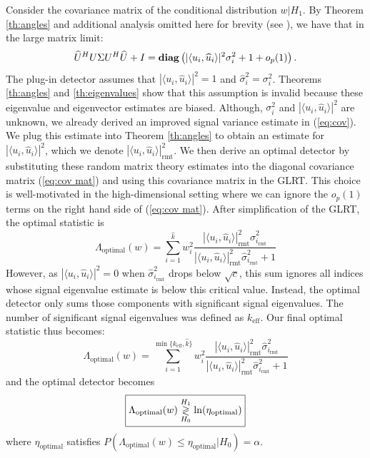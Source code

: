 Consider the covariance matrix of the conditional distribution $w|H_1$. By Theorem \ref{th:angles} and additional analysis omitted here for brevity (see \cite{asendorf}), we have that in the large matrix limit:
\begin{equation}\label{eq:cov mat}
\widehat{U}^HU\Sigma U^H\widehat{U}+I = \diag\left(|\langle u_i,\widehat{u}_i\rangle|^2\sigma_i^2 + 1 + o_{p}(1)\right).
\end{equation}
The plug-in detector assumes that $|\langle u_i,\widehat{u}_i\rangle|^2=1$ and $\widehat{\sigma}_i^2=\sigma_i^2$. Theorems \ref{th:angles} and \ref{th:eigenvalues} show that this assumption is invalid because these eigenvalue and eigenvector estimates are biased. Although, $\sigma_i^2$ and $|\langle u_i,\widehat{u}_i\rangle|^2$ are unknown, we already derived an improved signal variance estimate in (\ref{eq:cov}). We plug this estimate into Theorem \ref{th:angles} to obtain an estimate for $|\langle u_i,\widehat{u}_i\rangle|^2$, which we denote $|\langle u_i,\widehat{u}_i\rangle|^2_\text{rmt}$. We then derive an optimal detector by substituting these random matrix theory estimates into the diagonal covariance matrix (\ref{eq:cov mat}) and using this covariance matrix in the GLRT. This choice is well-motivated in the high-dimensional setting where we can ignore the $o_{p}(1)$ terms on the right hand side of (\ref{eq:cov mat}). After simplification of the GLRT, the optimal statistic is
\begin{equation*}
\Lambda_{\text{optimal}}(w)= \sum_{i=1}^{\widehat{k}}w_i^2\frac{|\langle u_i,\widehat{u}_i\rangle|^2_{\text{rmt}}\widehat{\sigma}_{i_\text{rmt}}^2}{|\langle u_i,\widehat{u}_i\rangle|^2_{\text{rmt}}\widehat{\sigma}_{i_\text{rmt}}^2 + 1}
\end{equation*}
However, as $|\langle u_i,\widehat{u}_i\rangle|^2=0$ when $\widehat{\sigma}_{i_\text{rmt}}^2$ drops below $\sqrt{c}$, this sum ignores all indices whose signal eigenvalue estimate is below this critical value. Instead, the optimal detector only sums those components with significant signal eigenvalues. The number of significant signal eigenvalues was defined as $k_\text{eff}$. Our final optimal statistic  thus becomes:
\begin{equation}\label{eq:rmt stat}
\boxed{\Lambda_{\text{optimal}}(w)= \sum_{i=1}^{\min\{k_\text{eff},\widehat{k}\}}w_i^2\frac{|\langle u_i,\widehat{u}_i\rangle|^2_{\text{rmt}}\widehat{\sigma}_{i_\text{rmt}}^2}{|\langle u_i,\widehat{u}_i\rangle|^2_{\text{rmt}}\widehat{\sigma}_{i_\text{rmt}}^2 + 1}}
\end{equation}
and the optimal detector becomes
\begin{equation}\label{eq:rmt classifier}
\boxed{\Lambda_{\text{optimal}}(w) \detgtrless \ln(\eta_{\text{optimal}})}
\end{equation}
where $\eta_{\text{optimal}}$ satisfies $P(\Lambda_{\text{optimal}}(w)\leq\eta_{\text{optimal}}|H_0)=\alpha$.

